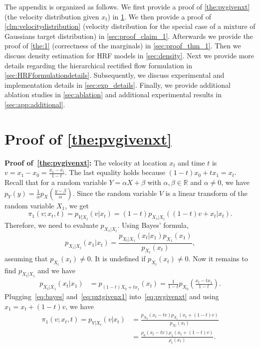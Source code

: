 The appendix is organized as follows. We first provide a proof of \cref{the:pvgivenxt} (the velocity distribution given $x_t$) in \cref{sec:proofpvgivenxt}. We then provide a proof of \cref{clm:velocitydistribution} (velocity distribution for the special case of a mixture of Gaussians target distribution) in \cref{sec:proof_claim_1}. Afterwards we provide the proof of \cref{the:1} (correctness of the marginals) in \cref{sec:proof_thm_1}. 
Then we discuss density estimation for HRF models in \cref{sec:density}.
Next we provide more details regarding the  hierarchical rectified flow formulation in \cref{sec:HRFformulationdetails}. 
Subsequently, we discuss experimental and implementation details in \cref{sec:exp_details}. Finally, we provide additional ablation studies in \cref{sec:ablation} and additional experimental results in \cref{sec:app:additional}.

\section{Proof of \cref{the:pvgivenxt}}
\label{sec:proofpvgivenxt}
\textbf{Proof of~\cref{the:pvgivenxt}:}
The velocity at location $x_t$ and time $t$ is $v = x_1 - x_0 = \frac{x_1 - x_t}{1-t}$. The last equality holds because $(1-t) x_0 + tx_1 = x_t$. Recall that for a random variable $Y = \alpha X + \beta$ with $\alpha, \beta \in \mathbb{R}$ and $\alpha \neq 0$, we have $p_Y(y) = \frac{1}{\alpha} p_X\left( \frac{y - \beta}{\alpha}\right)$. Since the random variable $V$ is a linear transform of the random variable $X_1$, we get
\begin{equation}
\label{eq:pvgivenxt}
\pi_1(v; x_t, t) = p_{V | X_t} (v | x_t) = (1-t) p_{X_1 | X_t}\left( (1-t)v + x_t | x_t \right).
\end{equation}
Therefore, we need to evaluate $p_{X_1 | X_t}$. Using Bayes' formula, 
\begin{equation}
\label{eq:bayes}
p_{X_1 | X_t} (x_1 | x_t) = \frac{p_{X_t | X_1}(x_t | x_1) p_{X_1}(x_1)}{p_{X_t}(x_t)},
\end{equation}
assuming that $p_{X_t}(x_t) \neq 0$. It is undefined if $p_{X_t}(x_t) \neq 0$. 
Now it remains to find $p_{X_t | X_1}$ and we have
\begin{align}
\label{eq:pxtgivenx1}
p_{X_t | X_1} (x_t | x_1) & = p_{(1-t)X_0 + t x_1}(x_t) =\frac{1}{1-t}p_{X_0}\left( \frac{x_t -t x_1}{1-t}\right). 
\end{align}
Plugging~\cref{eq:bayes} and~\cref{eq:pxtgivenx1} into~\cref{eq:pvgivenxt} and using $x_1 = x_t + (1-t) v$, we have 
\begin{align}
\pi_1(v; x_t, t)  = p_{V|X_t} (v | x_t) 
& = \frac{p_{X_0}(x_t - tv) p_{X_1}(x_t + (1-t)v)}{p_{X_t} (x_t)} \nonumber \\
& = \frac{\rho_0(x_t - tv) \rho_1(x_t + (1-t)v)}{\rho_t (x_t)}.
\end{align}

